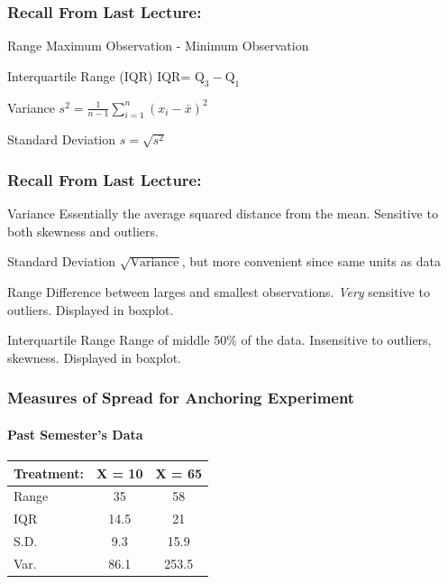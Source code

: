 \documentclass[handout]{beamer}
\date{Lecture \# 3}
\begin{document}
 





\begin{frame}[plain]
	\titlepage 
	

\end{frame} 

\begin{frame}
\frametitle{Recall From Last Lecture: }

\begin{block}{Range}
Maximum Observation - Minimum Observation
\end{block}
\pause
\begin{block}{Interquartile Range (IQR)}
IQR= $\mbox{Q}_3 - \mbox{Q}_1$
\end{block}
\pause
\begin{block}{Variance}
$\displaystyle s^2 = \frac{1}{n-1} \sum_{i=1}^n (x_i - \bar{x})^2$
\end{block}
\pause
 \begin{block}{Standard Deviation}
	$s = \sqrt{s^2}$
\end{block}
\end{frame}

\begin{frame}
\frametitle{Recall From Last Lecture:}
\begin{block}{Variance}
Essentially the average squared distance from the mean. Sensitive to both skewness and outliers.
\end{block}
\pause
\begin{block}{Standard Deviation}
$\sqrt{\mbox{Variance}}$, but more convenient since \alert{same units as data}
\end{block}
\pause
\begin{block}{Range}
Difference between larges and smallest observations. \emph{Very} sensitive to outliers. Displayed in boxplot.
\end{block}
\pause
\begin{block}{Interquartile Range}
Range of middle 50\% of the data. Insensitive to outliers, skewness. Displayed in boxplot.
\end{block}

\end{frame}


\begin{frame}
\frametitle{Measures of Spread for Anchoring Experiment}
\framesubtitle{Past Semester's Data}

\begin{table}
	\begin{tabular}{l|cc}
	Treatment: & X = 10 & X = 65\\
	\hline
		Range&35&58\\
		IQR&14.5&21\\
		S.D.&9.3&15.9\\
		Var.&86.1&253.5
	\end{tabular}
\end{table}
\end{frame}
\end{document}
